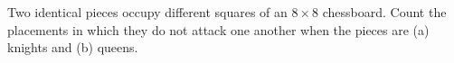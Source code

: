 Two identical pieces occupy different squares of an $8\times8$ chessboard. Count the placements in which they do not attack one another when the pieces are (a) knights and (b) queens.
